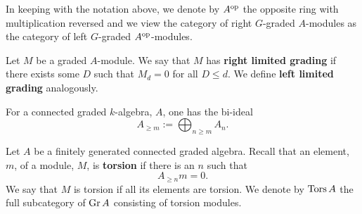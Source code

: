 \begin{remark}
  In keeping with the notation above, we denote by \(A^{\operatorname{op}}\) the opposite ring with multiplication reversed and we view the category of right \(G\)-graded \(A\)-modules as the category of left \(G\)-graded \(A^{\operatorname{op}}\)-modules.
\end{remark}

\begin{definition}
  Let \(M\) be a graded \(A\)-module. We say that \(M\) has \textbf{right limited grading} if there exists some \(D\) such that \(M_{d} = 0\) for all \(D \leq d\). We define \textbf{left limited grading} analogously.
\end{definition}

For a connected graded \(k\)-algebra, \(A\), one has the bi-ideal
\begin{displaymath}
  A_{\geq m} :=  \bigoplus_{n\geq m} A_n.
\end{displaymath}

\begin{definition}
  Let \(A\) be a finitely generated connected graded algebra. Recall that an element, \(m\), of a module, \(M\), is \textbf{torsion} if there is an \(n\) such that
  \begin{displaymath}
    A_{\geq n} m = 0.
  \end{displaymath}
  We say that \(M\) is torsion if all its elements are torsion.
  We denote by \(\operatorname{Tors}A\) the full subcategory of \(\operatorname{Gr}A\) consisting of torsion modules.
\end{definition}
